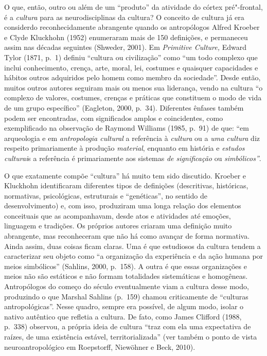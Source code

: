 O que, então, outro ou além de um ``produto'' da atividade do córtex
pré"-frontal, é a \emph{cultura} para as neurodisciplinas da cultura? O
conceito de cultura já era considerdo reconhecidamente abrangente quando
os antropólogos Alfred Kroeber e Clyde Kluckhohn (1952) enumeraram mais
de 150 definições, e permaneceu assim nas décadas seguintes (Shweder,
2001). Em \emph{Primitive Culture,} Edward Tylor (1871, p.~1) definiu
``cultura ou civilização'' como ``um todo complexo que inclui
conhecimento, crença, arte, moral, lei, costumes e quaisquer capacidades
e hábitos outros adquiridos pelo homem como membro da sociedade''. Desde
então, muitos outros autores seguiram mais ou menos sua liderança, vendo
na cultura ``o complexo de valores, costumes, crenças e práticas que
constituem o modo de vida de um grupo específico'' (Eagleton, 2000,
p.~34). Diferentes ênfases também podem ser encontradas, com significados
amplos e coincidentes, como exemplificado na observação de Raymond
Williams (1985, p.~91) de que: ``em arqueologia e em \emph{antropologia
cultural} a referência à \emph{cultura} ou a \emph{uma cultura} diz
respeito primariamente à produção \emph{material}, enquanto em história
e \emph{estudos culturai}s a referência é primariamente aos sistemas
\emph{de significação} ou \emph{simbólicos''}.

O que exatamente compõe ``cultura'' há muito tem sido discutido. Kroeber
e Kluckhohn identificaram diferentes tipos de definições (descritivas,
históricas, normativas, psicológicas, estruturais e ``genéticas'', no
sentido de desenvolvimento) e, com isso, produziram uma longa relação
dos elementos conceituais que as acompanhavam, desde atos e atividades
até emoções, linguagem e tradições. Os próprios autores criaram uma
definição muito abrangente, mas reconheceram que não há como avançar de
forma normativa. Ainda assim, duas coisas ficam claras. Uma é que
estudiosos da cultura tendem a caracterizar seu objeto como ``a
organização da experiência e da ação humana por meios simbólicos''
(Sahlins, 2000, p.~158). A outra é que essas organizações e meios não são
estáticos e não formam totalidades sistemáticas e homogêneas.
Antropólogos do começo do século  eventualmente viam a cultura desse
modo, produzindo o que Marshal Sahlins (p.~159) chamou criticamente de
``culturas antropológicas''. Nesse quadro, sempre era possível, de algum
modo, isolar o nativo autêntico que refletia a cultura. De fato, como
James Clifford (1988, p.~338) observou, a própria ideia de cultura ``traz
com ela uma expectativa de raízes, de uma existência estável,
territorializada'' (ver também o ponto de vista neuroantropológico em
Roepstorff, Niewöhner e Beck, 2010).

